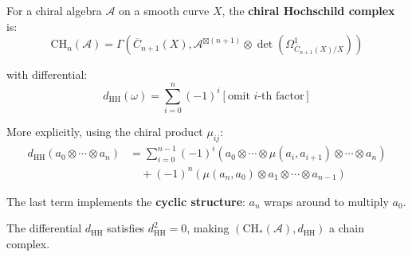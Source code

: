 \begin{definition}
\label{def:chiral-hochschild}
For a chiral algebra $\mathcal{A}$ on a smooth curve $X$, the \textbf{chiral 
Hochschild complex} is:
$$\text{CH}_n(\mathcal{A}) = \Gamma\left(\overline{C}_{n+1}(X), 
   \mathcal{A}^{\boxtimes(n+1)} \otimes \det\left(\Omega^1_{\overline{C}_{n+1}(X)/X}\right)\right)$$

with differential:
$$d_{\text{HH}}(\omega) = \sum_{i=0}^{n} (-1)^i \left[\text{omit } i\text{-th factor}\right]$$

More explicitly, using the chiral product $\mu_{ij}$:
\begin{align*}
d_{\text{HH}}(a_0 \otimes \cdots \otimes a_n) 
&= \sum_{i=0}^{n-1} (-1)^i (a_0 \otimes \cdots \otimes \mu(a_i, a_{i+1}) 
   \otimes \cdots \otimes a_n) \\
&\quad + (-1)^n (\mu(a_n, a_0) \otimes a_1 \otimes \cdots \otimes a_{n-1})
\end{align*}

The last term implements the \textbf{cyclic structure}: $a_n$ wraps around to multiply $a_0$.
\end{definition}

\begin{theorem}
\label{thm:hochschild-chain-complex}
The differential $d_{\text{HH}}$ satisfies $d_{\text{HH}}^2 = 0$, making 
$(\text{CH}_*(\mathcal{A}), d_{\text{HH}})$ a chain complex.
\end{theorem}

